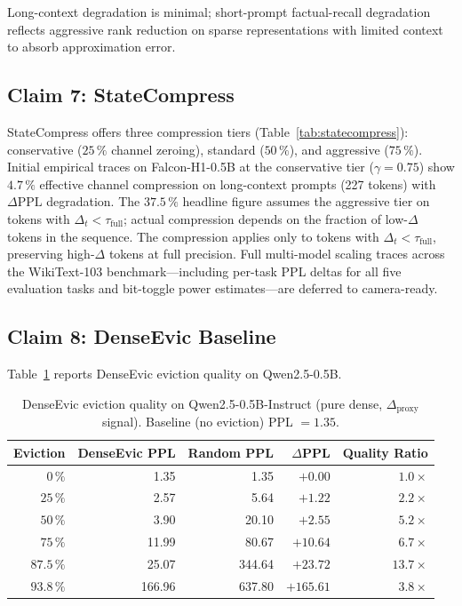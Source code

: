 \documentclass[11pt]{article}
\newcommand{\dsig}{\Delta}
\newcommand{\proxydsig}{\ensuremath{\dsig_{\mathrm{proxy}}}}
\begin{document}
Long-context degradation is minimal; short-prompt factual-recall degradation
reflects aggressive rank reduction on sparse representations with limited
context to absorb approximation error.

\subsection{Claim 7: StateCompress}
StateCompress offers three compression tiers (Table~\ref{tab:statecompress}):
conservative ($25\,\%$ channel zeroing), standard ($50\,\%$), and aggressive
($75\,\%$). Initial empirical traces on Falcon-H1-0.5B at the conservative
tier ($\gamma{=}0.75$) show $4.7\,\%$ effective channel compression on
long-context prompts (227 tokens) with $\Delta\mathrm{PPL}$ degradation.
The $37.5\,\%$ headline figure assumes the aggressive tier on tokens with
$\dsig_t < \tau_{\mathrm{full}}$; actual compression depends on the fraction
of low-$\dsig$ tokens in the sequence. The compression applies only to tokens
with $\dsig_t < \tau_{\mathrm{full}}$,
preserving high-$\dsig$ tokens at full precision. Full multi-model scaling
traces across the WikiText-103 benchmark---including per-task PPL deltas
for all five evaluation tasks and bit-toggle power estimates---are deferred
to camera-ready.

\subsection{Claim 8: DenseEvic Baseline}
Table~\ref{tab:denseevic} reports DenseEvic eviction quality on
Qwen2.5-0.5B.

\begin{table}[H]
\centering
\small
\caption{DenseEvic eviction quality on Qwen2.5-0.5B-Instruct (pure dense,
         $\proxydsig$ signal). Baseline (no eviction) PPL $=1.35$.}
\label{tab:denseevic}
\begin{tabular}{rrrrr}
\toprule
Eviction & DenseEvic PPL & Random PPL & $\Delta$PPL & Quality Ratio \\
\midrule
$0\,\%$    &   1.35 &    1.35  & $+0.00$   & $1.0\!\times$ \\
$25\,\%$   &   2.57 &    5.64  & $+1.22$   & $2.2\!\times$ \\
$50\,\%$   &   3.90 &   20.10  & $+2.55$   & $5.2\!\times$ \\
$75\,\%$   &  11.99 &   80.67  & $+10.64$  & $6.7\!\times$ \\
$87.5\,\%$ &  25.07 &  344.64  & $+23.72$  & $\mathbf{13.7\!\times}$ \\
$93.8\,\%$ & 166.96 &  637.80  & $+165.61$ & $3.8\!\times$ \\
\bottomrule
\end{tabular}
\end{table}
\end{document}
